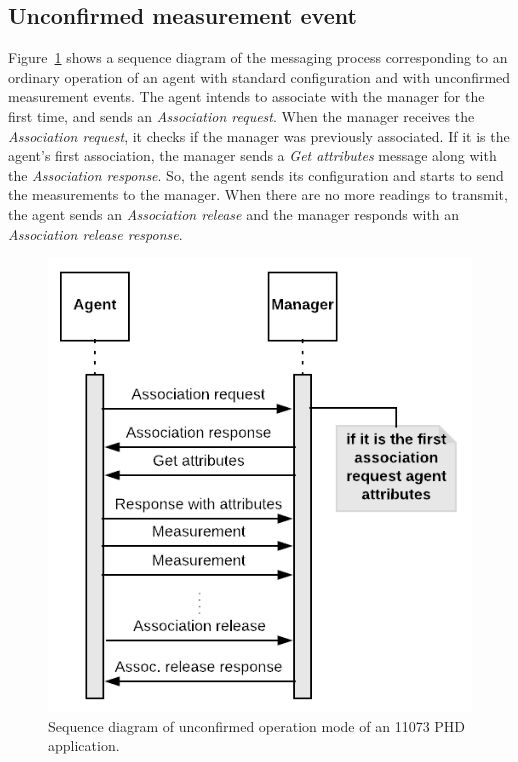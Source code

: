 \subsection{Unconfirmed measurement event}\label{sec:UnconfirmedMeasurementEvent}

Figure~\ref{fig:unconfirmedMode} shows a sequence diagram of the messaging process corresponding to an ordinary operation of an agent with standard configuration and with unconfirmed measurement events. The agent intends to associate with the manager for the first time, and sends an \textit{Association request}. When the manager receives the \textit{Association request}, it checks if the manager was previously associated. If it is the agent's first association, the manager sends a \textit{Get attributes} message along with the \textit{Association response}. So, the agent sends its configuration and starts to send the measurements to the manager. When there are no more readings to transmit, the agent sends an \textit{Association release} and the manager responds with an \textit{Association release response}.

\begin{figure}[htbp]
\centerline{\includegraphics[scale=0.35]{figures/unconfirmed.png}}
\caption{Sequence diagram of unconfirmed operation mode of an 11073 PHD application.}
\label{fig:unconfirmedMode}
\end{figure}


